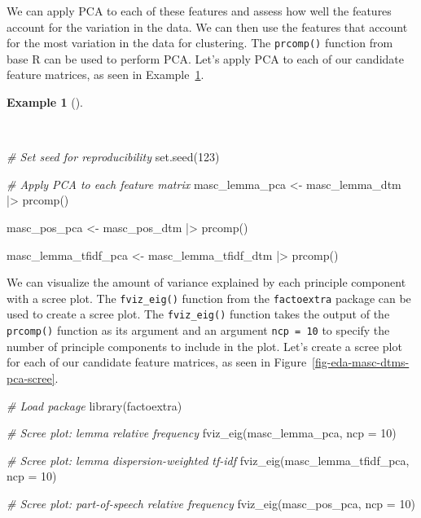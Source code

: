 \documentclass[
  letterpaper,
  DIV=11,
  numbers=noendperiod]{scrreport}
\newenvironment{Shaded}{\begin{snugshade}}{\end{snugshade}}
\newcommand{\AttributeTok}[1]{\textcolor[rgb]{0.00,0.00,0.00}{#1}}
\newcommand{\CommentTok}[1]{\textcolor[rgb]{0.00,0.00,0.00}{\textit{#1}}}
\newcommand{\DecValTok}[1]{\textcolor[rgb]{0.00,0.00,0.00}{#1}}
\newcommand{\FunctionTok}[1]{\textcolor[rgb]{0.00,0.00,0.00}{#1}}
\newcommand{\NormalTok}[1]{\textcolor[rgb]{0.00,0.00,0.00}{#1}}
\newcommand{\OtherTok}[1]{\textcolor[rgb]{0.00,0.00,0.00}{#1}}
\newcommand{\SpecialCharTok}[1]{\textcolor[rgb]{0.00,0.00,0.00}{#1}}
\theoremstyle{definition}
\newtheorem{example}{Example}[chapter]
\theoremstyle{remark}
\begin{document}
We can apply PCA to each of these features and assess how well the
features account for the variation in the data. We can then use the
features that account for the most variation in the data for clustering.
The \texttt{prcomp()} function from base R can be used to perform PCA.
Let's apply PCA to each of our candidate feature matrices, as seen in
Example~\ref{exm-eda-masc-dtms-pca}.

\begin{example}[]\protect\hypertarget{exm-eda-masc-dtms-pca}{}\label{exm-eda-masc-dtms-pca}

~

\begin{Shaded}
\begin{Highlighting}[]
\CommentTok{\# Set seed for reproducibility}
\FunctionTok{set.seed}\NormalTok{(}\DecValTok{123}\NormalTok{)}

\CommentTok{\# Apply PCA to each feature matrix}
\NormalTok{masc\_lemma\_pca }\OtherTok{\textless{}{-}} 
\NormalTok{  masc\_lemma\_dtm }\SpecialCharTok{|\textgreater{}} 
  \FunctionTok{prcomp}\NormalTok{()}

\NormalTok{masc\_pos\_pca }\OtherTok{\textless{}{-}} 
\NormalTok{  masc\_pos\_dtm }\SpecialCharTok{|\textgreater{}} 
  \FunctionTok{prcomp}\NormalTok{()}

\NormalTok{masc\_lemma\_tfidf\_pca }\OtherTok{\textless{}{-}} 
\NormalTok{  masc\_lemma\_tfidf\_dtm }\SpecialCharTok{|\textgreater{}} 
  \FunctionTok{prcomp}\NormalTok{()}
\end{Highlighting}
\end{Shaded}

\end{example}

We can visualize the amount of variance explained by each principle
component with a scree plot. The \texttt{fviz\_eig()} function from the
\texttt{factoextra} package can be used to create a scree plot. The
\texttt{fviz\_eig()} function takes the output of the \texttt{prcomp()}
function as its argument and an argument \texttt{ncp\ =\ 10} to specify
the number of principle components to include in the plot. Let's create
a scree plot for each of our candidate feature matrices, as seen in
Figure~\ref{fig-eda-masc-dtms-pca-scree}.

\begin{Shaded}
\begin{Highlighting}[]
\CommentTok{\# Load package}
\FunctionTok{library}\NormalTok{(factoextra)}

\CommentTok{\# Scree plot: lemma relative frequency}
\FunctionTok{fviz\_eig}\NormalTok{(masc\_lemma\_pca, }\AttributeTok{ncp =} \DecValTok{10}\NormalTok{)}

\CommentTok{\# Scree plot: lemma dispersion{-}weighted tf{-}idf}
\FunctionTok{fviz\_eig}\NormalTok{(masc\_lemma\_tfidf\_pca, }\AttributeTok{ncp =} \DecValTok{10}\NormalTok{)}

\CommentTok{\# Scree plot: part{-}of{-}speech relative frequency}
\FunctionTok{fviz\_eig}\NormalTok{(masc\_pos\_pca, }\AttributeTok{ncp =} \DecValTok{10}\NormalTok{)}
\end{Highlighting}
\end{Shaded}
\end{document}
